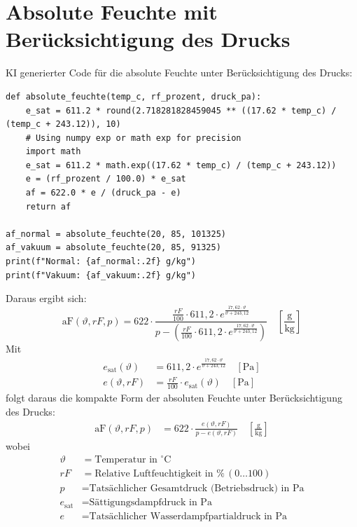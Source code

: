 \section{Absolute Feuchte mit Berücksichtigung des Drucks}
KI generierter Code für die absolute Feuchte unter Berücksichtigung des Drucks:
\begin{verbatim}
def absolute_feuchte(temp_c, rf_prozent, druck_pa):
    e_sat = 611.2 * round(2.718281828459045 ** ((17.62 * temp_c) / (temp_c + 243.12)), 10)
    # Using numpy exp or math exp for precision
    import math
    e_sat = 611.2 * math.exp((17.62 * temp_c) / (temp_c + 243.12))
    e = (rf_prozent / 100.0) * e_sat
    af = 622.0 * e / (druck_pa - e)
    return af

af_normal = absolute_feuchte(20, 85, 101325)
af_vakuum = absolute_feuchte(20, 85, 91325)
print(f"Normal: {af_normal:.2f} g/kg")
print(f"Vakuum: {af_vakuum:.2f} g/kg")
\end{verbatim}
Daraus ergibt sich:
\begin{equation}
    \text{aF}(\vartheta, rF, p) = 622 \cdot \frac{\frac{rF}{100} \cdot 611{,}2 \cdot e^{\frac{17{,}62 \cdot \vartheta}{\vartheta + 243{,}12}}}{p - \left(\frac{rF}{100} \cdot 611{,}2 \cdot e^{\frac{17{,}62 \cdot \vartheta}{\vartheta + 243{,}12}}\right)} \quad \left[\frac{\text{g}}{\text{kg}}\right]
\end{equation}
Mit  
\begin{align}
e_{\text{sat}}(\vartheta) &= 611{,}2 \cdot e^{\frac{17{,}62 \cdot \vartheta}{\vartheta + 243{,}12}} \quad [\text{Pa}] \\[4ex]
e(\vartheta, rF) &= \frac{rF}{100} \cdot e_{\text{sat}}(\vartheta) \quad [\text{Pa}]
\end{align}
folgt daraus die kompakte Form der absoluten Feuchte unter Berücksichtigung des Drucks:
\begin{align}
\text{aF}(\vartheta, rF, p) &= 622 \cdot \frac{e(\vartheta, rF)}{p - e(\vartheta, rF)} \quad \left[\frac{\text{g}}{\text{kg}}\right]
\end{align}
wobei
\begin{align*}
\vartheta &= \text{Temperatur in } ^\circ\text{C} \\[3ex]
rF &= \text{Relative Luftfeuchtigkeit in } \% \, (0 \dots 100) \\[3ex]
p &= \text{Tatsächlicher Gesamtdruck (Betriebsdruck) in Pa} \\[3ex]
e_{\text{sat}} &= \text{Sättigungsdampfdruck in Pa} \\[3ex]
e &= \text{Tatsächlicher Wasserdampfpartialdruck in Pa}
\end{align*}
